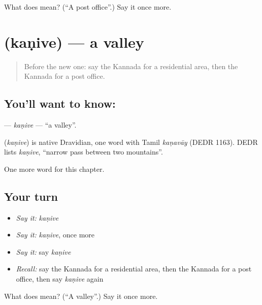 \begin{tcolorbox}[breakable,colback=teal!4,colframe=teal!35!black,title={Before you move on}]
What does   mean? (\textquotedblleft{}A post office\textquotedblright{}.) Say it once more.
\end{tcolorbox}
\section[\texorpdfstring{\kn{ಕಣಿವೆ} (kaṇive)}{ಕಣಿವೆ (kaṇive)}]{ (kaṇive) — a valley}

\label{lesson:KA-C250-kanive}



\begin{quote}
Before the new one: say the Kannada for a residential area, then the Kannada for a post office.
\end{quote}

\subsection*{You'll want to know: }
\textbf{} — \emph{kaṇive} — \textquotedblleft{}a valley\textquotedblright{}.

\begin{cousinweb}
\textbf{} (\emph{kaṇive}) is native Dravidian, one word with Tamil \emph{kaṇavāy} (DEDR 1163). DEDR lists \emph{kaṇive}, \textquotedblleft{}narrow pass between two mountains\textquotedblright{}.
\end{cousinweb}

\begin{grammarlens}[title={What you've built}]
One more word for this chapter.
\end{grammarlens}

\subsection*{Your turn}
\begin{itemize}
\raggedright
  \item \emph{Say it:} \emph{kaṇive}
  \item \emph{Say it:} \emph{kaṇive}, once more
  \item \emph{Say it:} say \emph{kaṇive}
  \item \emph{Recall:} say the Kannada for a residential area, then the Kannada for a post office, then say \emph{kaṇive} again
\end{itemize}

\begin{tcolorbox}[breakable,colback=teal!4,colframe=teal!35!black,title={Before you move on}]
What does  mean? (\textquotedblleft{}A valley\textquotedblright{}.) Say it once more.
\end{tcolorbox}
